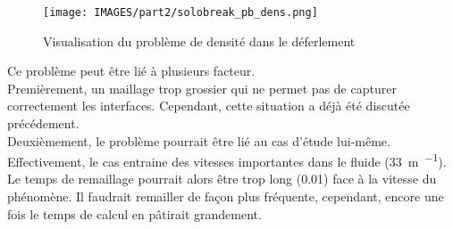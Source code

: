 \documentclass[../main.tex]{subfiles}
\begin{document}
\begin{figure}[H]
    \centering
    \texttt{[image: IMAGES/part2/solobreak\_pb\_dens.png]}
    \caption{Visualisation du problème de densité dans le déferlement}
\end{figure}

Ce problème peut être lié à plusieurs facteur.\\
Premièrement, un maillage trop grossier qui ne permet pas de capturer correctement les interfaces. Cependant, cette situation a déjà été discutée précédement.\\
Deuxièmement, le problème pourrait être lié au cas d'étude lui-même. Effectivement, le cas entraine des vitesses importantes dans le fluide (\qty{33}{\meter\per\sec}). Le temps de remaillage pourrait alors être trop long (\qty{0.01}{\sec}) face à la vitesse du phénomène. Il faudrait remailler de façon plus fréquente, cependant, encore une fois le temps de calcul en pâtirait grandement.
\end{document}
